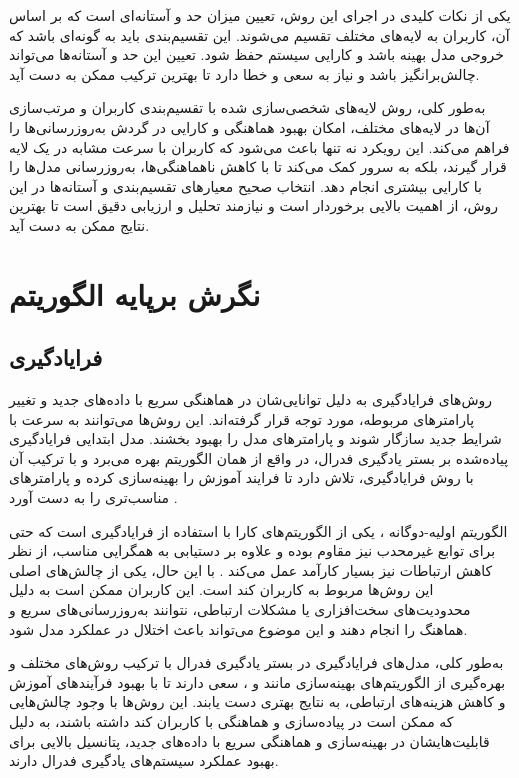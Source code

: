 یکی از نکات کلیدی در اجرای این روش، تعیین میزان حد و آستانه‌ای است که بر اساس آن، کاربران به لایه‌های مختلف تقسیم می‌شوند. این تقسیم‌بندی باید به گونه‌ای باشد که خروجی مدل بهینه باشد و کارایی سیستم حفظ شود. تعیین این حد و آستانه‌ها می‌تواند چالش‌برانگیز باشد و نیاز به سعی و خطا دارد تا بهترین ترکیب ممکن به دست آید.

به‌طور کلی، روش لایه‌های شخصی‌سازی شده با تقسیم‌بندی کاربران و مرتب‌سازی آن‌ها در لایه‌های مختلف، امکان بهبود هماهنگی و کارایی در گردش به‌روزرسانی‌ها را فراهم می‌کند. این رویکرد نه تنها باعث می‌شود که کاربران با سرعت مشابه در یک لایه قرار گیرند، بلکه به سرور کمک می‌کند تا با کاهش ناهماهنگی‌ها، به‌روزرسانی مدل‌ها را با کارایی بیشتری انجام دهد. انتخاب صحیح معیارهای تقسیم‌بندی و آستانه‌ها در این روش، از اهمیت بالایی برخوردار است و نیازمند تحلیل و ارزیابی دقیق است تا بهترین نتایج ممکن به دست آید.




\section{نگرش برپایه الگوریتم}
\subsection{فرایادگیری}
روش‌های فرایادگیری به دلیل توانایی‌شان در هماهنگی سریع با داده‌های جدید و تغییر پارامترهای مربوطه، مورد توجه قرار گرفته‌اند. این روش‌ها می‌توانند به سرعت با شرایط جدید سازگار شوند و پارامترهای مدل را بهبود بخشند.
مدل ابتدایی فرایادگیری پیاده‌شده بر بستر یادگیری فدرال، در واقع از همان الگوریتم
بهره می‌برد و با ترکیب آن با روش فرایادگیری، تلاش دارد تا فرایند آموزش را بهینه‌سازی کرده و پارامترهای مناسب‌تری را به دست آورد
\cite{jiang2019improving}.

الگوریتم اولیه-دوگانه%
%
، یکی از الگوریتم‌های کارا با استفاده از فرایادگیری است که حتی برای توابع غیرمحدب نیز مقاوم بوده و علاوه بر دستیابی به همگرایی مناسب، از نظر کاهش ارتباطات نیز بسیار کارآمد عمل می‌کند
\cite{zhang2021fedpd}.
با این حال، یکی از چالش‌های اصلی این روش‌ها مربوط به کاربران کند است. این کاربران ممکن است به دلیل محدودیت‌های سخت‌افزاری یا مشکلات ارتباطی، نتوانند به‌روزرسانی‌های سریع و هماهنگ را انجام دهند و این موضوع می‌تواند باعث اختلال در عملکرد مدل شود.

به‌طور کلی، مدل‌های فرایادگیری در بستر یادگیری فدرال با ترکیب روش‌های مختلف و بهره‌گیری از الگوریتم‌های بهینه‌سازی مانند
و
%
، سعی دارند تا با بهبود فرآیندهای آموزش و کاهش هزینه‌های ارتباطی، به نتایج بهتری دست یابند. این روش‌ها با وجود چالش‌هایی که ممکن است در پیاده‌سازی و هماهنگی با کاربران کند داشته باشند، به دلیل قابلیت‌هایشان در بهینه‌سازی و هماهنگی سریع با داده‌های جدید، پتانسیل بالایی برای بهبود عملکرد سیستم‌های یادگیری فدرال دارند.

